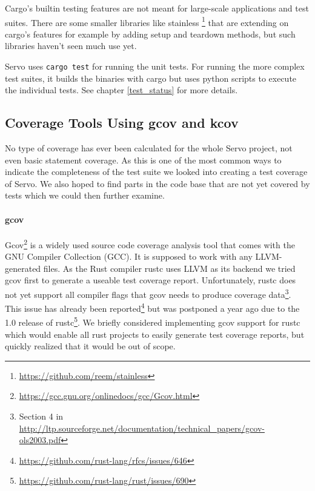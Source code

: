 \documentclass{scrartcl}
\begin{document}
Cargo's builtin testing features are not meant for large-scale applications and test suites. There are some smaller libraries like stainless \footnote{\url{https://github.com/reem/stainless}} that are extending on cargo's features for example by adding setup and teardown methods, but such libraries haven't seen much use yet. 

Servo uses \texttt{cargo test} for running the unit tests. For running the more complex test suites, it builds the binaries with cargo but uses python scripts to execute the individual tests. See chapter \ref{test_status} for more details.


\subsection{Coverage Tools Using gcov and kcov}

No type of coverage has ever been calculated for the whole Servo project, not even basic statement coverage. As this is one of the most common ways to indicate the completeness of the test suite we looked into creating a test coverage of Servo. We also hoped to find parts in the code base that are not yet covered by tests which we could then further examine. 

\paragraph{gcov}
Gcov\footnote{\url{https://gcc.gnu.org/onlinedocs/gcc/Gcov.html}} is a widely used source code coverage analysis tool that comes with the GNU Compiler Collection (GCC). It is supposed to work with any LLVM-generated files. As the Rust compiler rustc uses LLVM as its backend we tried gcov first to generate a useable test coverage report. Unfortunately, rustc does not yet support all compiler flags that gcov needs to produce coverage data\footnote{Section 4 in \url{http://ltp.sourceforge.net/documentation/technical_papers/gcov-ols2003.pdf}}. This issue has already been reported\footnote{\url{https://github.com/rust-lang/rfcs/issues/646}} but was postponed a year ago due to the 1.0 release of rustc\footnote{\url{https://github.com/rust-lang/rust/issues/690}}. We briefly considered implementing gcov support for rustc which would enable all rust projects to easily generate test coverage reports, but quickly realized that it would be out of scope.
\end{document}
